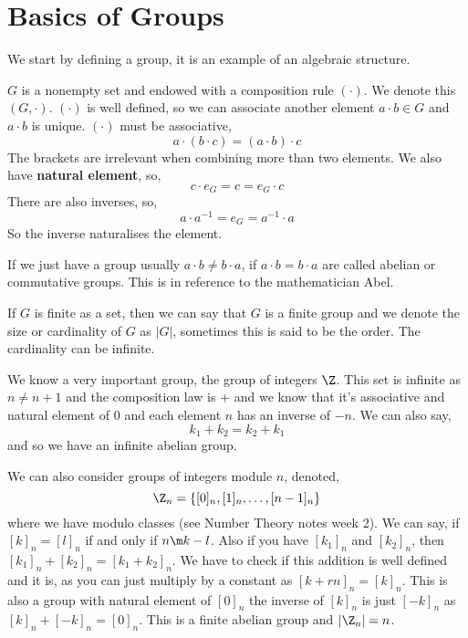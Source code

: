 
\section{Basics of Groups}
We start by defining a group, it is an example of an algebraic structure.
\begin{ndefi}[Group]
  $G$ is a nonempty set and endowed with a composition rule $(\cdot)$. We denote this $(G, \cdot)$. $(\cdot)$ is well defined, so we can associate another element $a \cdot b \in G$ and $a \cdot b$ is unique. $(\cdot)$ must be associative,
  $$ a \cdot (b \cdot c) = (a \cdot b) \cdot c $$
  The brackets are irrelevant when combining more than two elements. We also have \textbf{natural element}, so,
  $$ c \cdot e_G = c = e_G \cdot c $$
  There are also inverses, so,
  $$ a \cdot a^{-1} = e_G = a^{-1} \cdot a $$
  So the inverse naturalises the element.
\end{ndefi}

\noindent
If we just have a group usually $a \cdot b \ne b \cdot a$, if $a \cdot b = b \cdot a$ are called abelian or commutative groups. This is in reference to the mathematician Abel.

\noindent
If $G$ is finite as a set, then we can say that $G$ is a finite group and we denote the size or cardinality of $G$ as $|G|$, sometimes this is said to be the order. The cardinality can be infinite.\\

\noindent
\begin{eg}
  We know a very important group, the group of integers $\Z$. This set is infinite as $n \ne n + 1$ and the composition law is $+$ and we know that it's associative and natural element of $0$ and each element $n$ has an inverse of $-n$. We can also say,
  $$ k_1 + k_2 = k_2 + k_1 $$
  and so we have an infinite abelian group.
\end{eg}

\begin{eg}
  We can also consider groups of integers module $n$, denoted,
  $$ \Z_n = \{[0]_n, [1]_n, \dots, [n-1]_n\} $$
  where we have modulo classes (see Number Theory notes week 2). We can say, if $[k]_n = [l]_n$ if and only if $n \m k - l$. Also if you have $[k_1]_n$ and $[k_2]_n$, then $[k_1]_n + [k_2]_n = [k_1 + k_2]_n$. We have to check if this addition is well defined and it is, as you can just multiply by a constant as $[k+ rn]_n = [k]_n$. This is also a group with natural element of $[0]_n$ the inverse of $[k]_n$ is just $[-k]_n$ as $[k]_n + [-k]_n = [0]_n$. This is a finite abelian group and $|\Z_n| = n$.
\end{eg}

